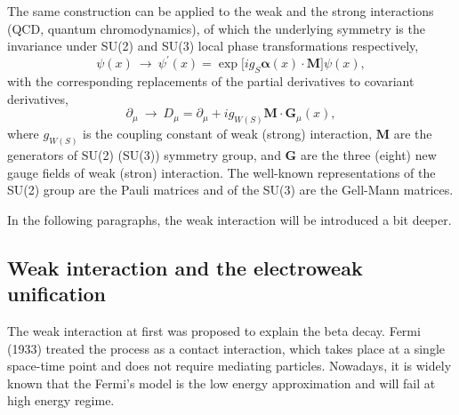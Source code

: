 The same construction can be applied to the weak and the strong interactions (QCD, quantum chromodynamics), of which the underlying symmetry is the invariance under SU(2) and SU(3) local phase transformations respectively,
\begin{equation}
\label{eqn:SU3transform}
\psi(x) \ \to\ \psi^{\prime}(x) = \exp\bigg[ig_{S}\boldsymbol{\alpha}(x)\cdot\boldsymbol{M}\bigg]\psi(x),
\end{equation}
with the corresponding replacements of the partial derivatives to covariant derivatives,
\begin{equation}
\label{eqn:covderivative_SU23}
\partial_{\mu}\ \to\ D_{\mu}=\partial_{\mu}+ig_{W(S)}\boldsymbol{M}\cdot \boldsymbol{G}_{\mu}(x),
\end{equation}
where $g_{W(S)}$ is the coupling constant of weak (strong) interaction, $\boldsymbol{M}$ are the generators of SU(2) (SU(3)) symmetry group, and $\boldsymbol{G}$ are the three (eight) new gauge fields of weak (stron) interaction.
The well-known representations of the SU(2) group are the Pauli matrices and of the SU(3) are the Gell-Mann matrices.

In the following paragraphs, the weak interaction will be introduced a bit deeper.

\subsection{Weak interaction and the electroweak unification}
The weak interaction at first was proposed to explain the beta decay. Fermi (1933) treated the process as a contact interaction, which takes place at a single space-time point and does not require mediating particles. Nowadays, it is widely known that the Fermi's model is the low energy approximation and will fail at high energy regime. 


